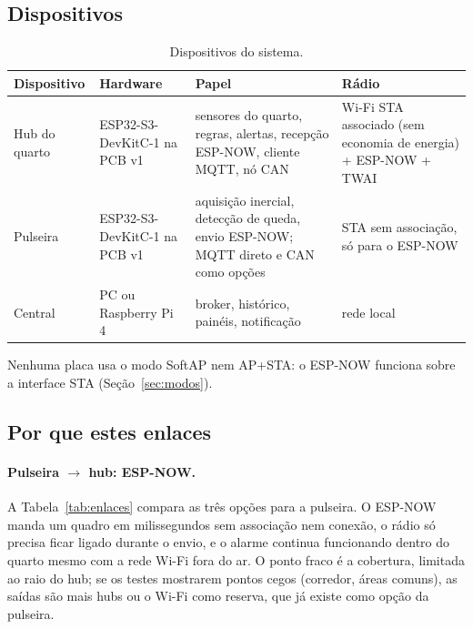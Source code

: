 \subsection{Dispositivos}

\begin{table}[H]
\centering
\caption{Dispositivos do sistema.}
\label{tab:dispositivos}
\small
\begin{tabular}{@{}>{\raggedright\arraybackslash}p{2.3cm}>{\raggedright\arraybackslash}p{2.6cm}>{\raggedright\arraybackslash}p{5.0cm}>{\raggedright\arraybackslash}p{4.2cm}@{}}
\toprule
Dispositivo & Hardware & Papel & Rádio \\
\midrule
Hub do quarto & ESP32-S3-DevKitC-1 na PCB v1 & sensores do quarto, regras, alertas, recepção ESP-NOW, cliente MQTT, nó CAN & Wi-Fi STA associado (sem economia de energia) + ESP-NOW + TWAI \\
Pulseira & ESP32-S3-DevKitC-1 na PCB v1 & aquisição inercial, detecção de queda, envio ESP-NOW; MQTT direto e CAN como opções & STA sem associação, só para o ESP-NOW \\
Central & PC ou Raspberry Pi 4 & broker, histórico, painéis, notificação & rede local \\
\bottomrule
\end{tabular}
\end{table}

Nenhuma placa usa o modo SoftAP nem AP+STA: o ESP-NOW funciona sobre a interface STA
(Seção~\ref{sec:modos}).

\subsection{Por que estes enlaces}\label{sec:enlaces}

\paragraph{Pulseira $\to$ hub: ESP-NOW.} A Tabela~\ref{tab:enlaces} compara as três opções
para a pulseira. O ESP-NOW manda um quadro em milissegundos sem associação nem conexão, o
rádio só precisa ficar ligado durante o envio, e o alarme continua funcionando dentro do
quarto mesmo com a rede Wi-Fi fora do ar. O ponto fraco é a cobertura, limitada ao raio do
hub; se os testes mostrarem pontos cegos (corredor, áreas comuns), as saídas são mais hubs
ou o Wi-Fi como reserva, que já existe como opção da pulseira.


